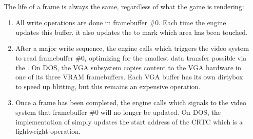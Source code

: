 \par
 \\
\par
\vspace{5pt}
\pagebreak
\par
The life of a frame is always the same, regardless of what the game is rendering:
\begin{enumerate}
\item All write operations are done in framebuffer \#0. Each time the engine updates this buffer, it also updates the  to mark which area has been touched.
\item After a major write sequence, the engine calls  which triggers the video system to read framebuffer \#0, optimizing for the smallest data transfer possible via the . On DOS, the VGA subsystem copies content to the VGA hardware in one of its three VRAM framebuffers. Each VGA buffer has its own dirtybox  to speed up blitting, but this remains an expensive operation.

\item Once a frame has been completed, the engine calls   which signals to the video system that framebuffer \#0 will no longer be updated. On DOS, the implementation of  simply updates the start address of the CRTC which is a lightweight operation.
\end{enumerate}
\par
{}\\
